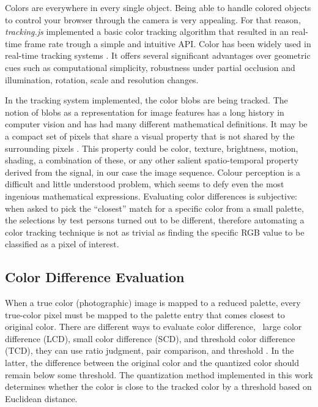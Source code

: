 Colors are everywhere in every single object. Being able to handle colored objects to control your browser through the camera is very appealing. For that reason, \textit{tracking.js} implemented a basic color tracking algorithm that resulted in an real-time frame rate trough a simple and intuitive API.
Color has been widely used in real-time tracking systems \cite{Paschos2001}. It offers several significant advantages over geometric cues such as computational simplicity, robustness under partial occlusion and illumination, rotation, scale and resolution changes.

In the tracking system implemented, the color blobs are being tracked. The notion of blobs as a representation for image features has a long history in computer vision and has had many different mathematical definitions. It may be a compact set of pixels that share a visual property that is not shared by the surrounding pixels \cite{Kravtchenko1999}. This property could be color, texture, brightness, motion, shading, a combination of these, or any other salient spatio-temporal property derived from the signal, in our case the image sequence.
Colour perception is a difficult and little understood problem, which seems to defy even the most ingenious mathematical expressions. Evaluating color differences is subjective: when asked to pick the ``closest'' match for a specific color from a small palette, the selections by test persons turned out to be different, therefore automating a color tracking technique is not as trivial as finding the specific RGB \cite{Gonzalez2007} value to be classified as a pixel of interest.


\subsection{Color Difference Evaluation} %
\label{sub:tracking_library_for_the_web:color_tracking_algorithm:color_difference_evaluation}

When a true color (photographic) image is mapped to a reduced palette, every true-color pixel must be mapped to the palette entry that comes closest to original color.
There are different ways to evaluate color difference, \ie\ large color difference (LCD), small color difference (SCD), and threshold color difference (TCD), they can use ratio judgment, pair comparison, and threshold \cite{Li2003}. In the latter, the difference between the original color and the quantized color should remain below some threshold. The quantization method implemented in this work determines whether the color is close to the tracked color by a threshold based on Euclidean distance.

